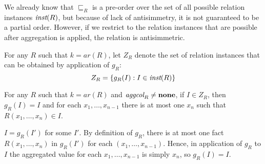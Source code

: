 We already know that $\sqsubseteq_R$ is a pre-order over the set of all possible relation instances $\textit{inst}(R)$, but because of lack of antisimmetry, it is not guaranteed to be a partial order. However, if we restrict to the relation instances that are possible after aggregation is applied, the relation is antisimmetric.

For any $R$ such that $k=ar(R)$, let $Z_R$ denote the set of relation instances that can be obtained by application of $g_R$:
$$Z_R = \{g_R(I): I \in \textit{inst}(R)\}$$


\begin{lem}
For any $R$ such that $k=ar(R)$ and $\textit{aggcol}_R \ne {\bf none}$, if $I \in Z_R$, then $g_R(I) = I$ and for each $x_1, \dots, x_{n-1}$ there is at most one $x_n$ such that $R(x_1, \dots, x_n) \in I$.
\end{lem}\label{lem:fixgr}
\begin{prof}
$I = g_R(I')$ for some $I'$. By definition of $g_R$, there is at most one fact $R(x_1, \dots, x_n)$ in $g_R(I')$ for each $(x_1, \dots, x_{n-1})$. Hence, in application of $g_R$ to $I$ the aggregated value for each $x_1, \dots, x_{n-1}$ is simply $x_n$, so $g_R(I) = I$.
\end{prof}

